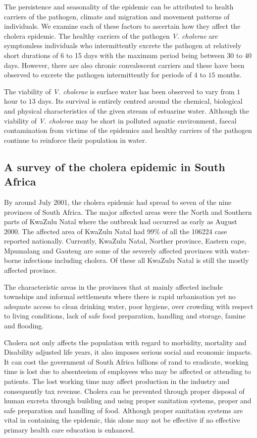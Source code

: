 \documentclass[12pt,a4paper]{article}
\begin{document}
The persistence and seasonality of the epidemic can be attributed to health carriers of the pathogen, climate and 
migration and movement patterns of individuals. We examine each of these factors to ascertain how they affect the 
cholera epidemic. The healthy carriers of the pathogen \textit{V. cholerae} are symptomless individuals who 
intermittently excrete the pathogen at relatively short durations of 6 to 15 days  with the maximum period being 
between $30$ to $40$ days. However, there are also chronic convalescent carriers and these have been observed to 
excrete the pathogen intermittently for periods of $4$ to $15$ months. 

The viability of \textit{V. cholerae} is surface water has been observed to vary from $1$ hour to $13$ days. Its 
survival is entirely centred around the chemical, biological and physical characteristics of the given stream of 
estuarine water. Although the viability of \textit{V. cholerae} may be short in polluted aquatic environment, 
faecal contamination from victims of the epidemics and healthy carriers of the pathogen continue to reinforce their 
population in water. 

\subsection{A survey of the cholera epidemic in  South Africa}
By around July 2001, the cholera epidemic had spread  to seven of the nine provinces of South Africa. The major 
affected areas were the North and Southern parts of KwaZulu Natal where the outbreak had occurred as early as 
August 2000. The affected area of KwaZulu Natal had 99\%  of all the 106224 case reported nationally. Currently, KwaZulu Natal, Norther province, Eastern cape, Mpumalang and Gauteng are some of the severely affected provinces with water-borne infections including cholera. Of these all KwaZulu Natal is still the mostly affected province.

The characteristic areas in the provinces that at mainly affected include townships and informal settlements where there is rapid urbanisation yet no adequate access to clean drinking water, poor hygiene, over crowding with respect to living conditions, lack of safe food preparation, handling and storage, famine and flooding.

Cholera not only affects the population with regard to morbidity, mortality and Disability adjusted life years, it also imposes serious social and economic impacts. It can cost the government of South Africa billions of rand to eradicate, working time is lost due to absenteeism  of employees who may be affected or attending to patients. The lost working time may affect production in the industry and consequently tax revenue.
\cite{Blower,Pascual,Seas}
Cholera can be prevented through proper disposal of human excreta through building and using proper sanitation systems, proper and safe preparation and handling of food. Although proper sanitation systems are vital in containing the epidemic, this alone may not be effective if no effective primary health care education is enhanced.
\end{document}
